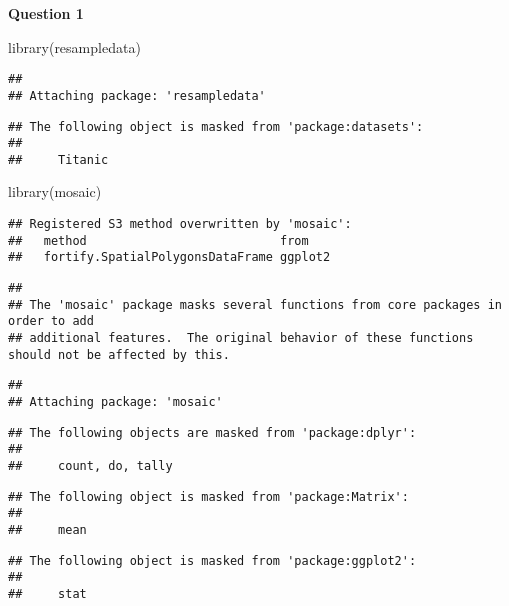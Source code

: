 \documentclass[
]{article}
\author{}
\date{\vspace{-2.5em}}
\newenvironment{Shaded}{\begin{snugshade}}{\end{snugshade}}
\newcommand{\FunctionTok}[1]{\textcolor[rgb]{0.00,0.00,0.00}{#1}}
\newcommand{\NormalTok}[1]{#1}
\begin{document}
\textbf{Question 1}

\begin{Shaded}
\begin{Highlighting}[]
\FunctionTok{library}\NormalTok{(resampledata)}
\end{Highlighting}
\end{Shaded}

\begin{verbatim}
## 
## Attaching package: 'resampledata'
\end{verbatim}

\begin{verbatim}
## The following object is masked from 'package:datasets':
## 
##     Titanic
\end{verbatim}

\begin{Shaded}
\begin{Highlighting}[]
\FunctionTok{library}\NormalTok{(mosaic)}
\end{Highlighting}
\end{Shaded}

\begin{verbatim}
## Registered S3 method overwritten by 'mosaic':
##   method                           from   
##   fortify.SpatialPolygonsDataFrame ggplot2
\end{verbatim}

\begin{verbatim}
## 
## The 'mosaic' package masks several functions from core packages in order to add 
## additional features.  The original behavior of these functions should not be affected by this.
\end{verbatim}

\begin{verbatim}
## 
## Attaching package: 'mosaic'
\end{verbatim}

\begin{verbatim}
## The following objects are masked from 'package:dplyr':
## 
##     count, do, tally
\end{verbatim}

\begin{verbatim}
## The following object is masked from 'package:Matrix':
## 
##     mean
\end{verbatim}

\begin{verbatim}
## The following object is masked from 'package:ggplot2':
## 
##     stat
\end{verbatim}
\end{document}
